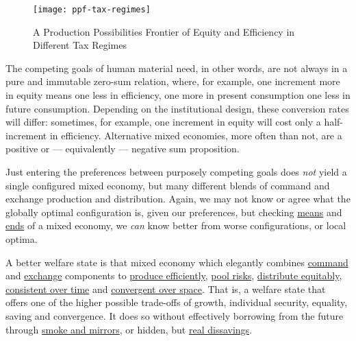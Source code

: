 
\begin{figure}[htbp]
	\centering
	\texttt{[image: ppf-tax-regimes]}  
	\caption[Equity-Efficiency Trade-offs of Different Tax Regimes]{A Production Possibilities Frontier of Equity and Efficiency in Different Tax Regimes}
	\label{fig:ppf-tax-regimes} %
\end{figure}

The competing goals of human material need, in other words, are not always in a pure and immutable zero-sum relation, where, for example, one increment more in equity means one less in efficiency, one more in present consumption one less in future consumption. Depending on the institutional design, these conversion rates will differ: sometimes, for example, one increment in equity will cost only a half-increment in efficiency. Alternative mixed economies, more often than not, are a positive or --- equivalently --- negative sum proposition. 

Just entering the preferences between purposely competing goals does \emph{not} yield a single configured mixed economy, but many different blends of command and exchange production and distribution. Again, we may not know or agree what the globally optimal configuration is, given our preferences, but checking \hyperref[sec:means]{means} and \hyperref[sec:ends]{ends} of a mixed economy, we \emph{can} know better from worse configurations, or local optima.

A better welfare state is that mixed economy which elegantly combines \hyperref[sec:command]{command} and \hyperref[sec:exchange]{exchange} components to \hyperref[sec:production]{produce efficiently}, \hyperref[sec:risk]{pool risks}, \hyperref[sec:distribution]{distribute equitably}, \hyperref[sec:time]{consistent over time} and \hyperref[sec:space]{convergent over space}. That is, a welfare state that offers one of the higher possible trade-offs of growth, individual security, equality, saving and convergence. It does so without effectively borrowing from the future through \hyperref[sec:smoke-n-mirrors]{smoke and mirrors}, or hidden, but \hyperref[sec:real-dissavings]{real dissavings}. 



